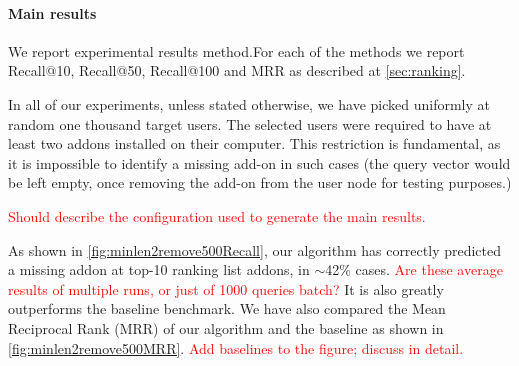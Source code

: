 \documentclass[11pt,oneside]{book}
\begin{document}
\paragraph{Main results}

We report experimental results method.For each of the methods we report Recall@10, Recall@50,
Recall@100 and MRR as described at \autoref{sec:ranking}. 

In all of our experiments, unless stated otherwise, we have picked uniformly at random one
thousand target users. The selected users were required to have at least two addons installed
on their computer. This restriction is fundamental, as it is impossible to identify a missing add-on in such cases (the query vector would be left empty, once removing the add-on from the user node for testing purposes.)  

\textcolor{red}{Should describe the configuration used to generate the main results.}

As shown in \autoref{fig:minlen2remove500Recall}, our algorithm has correctly
predicted a missing addon at top-10 ranking list addons, in
{$\sim$}42\% cases. \textcolor{red}{Are these average results of multiple runs, or just of 1000 queries batch?} It is also greatly outperforms the baseline
benchmark. We have also compared the Mean Reciprocal Rank (MRR) of our
algorithm and the baseline as shown in
\autoref{fig:minlen2remove500MRR}. \textcolor{red}{Add baselines to the figure; discuss in detail.}
\end{document}
